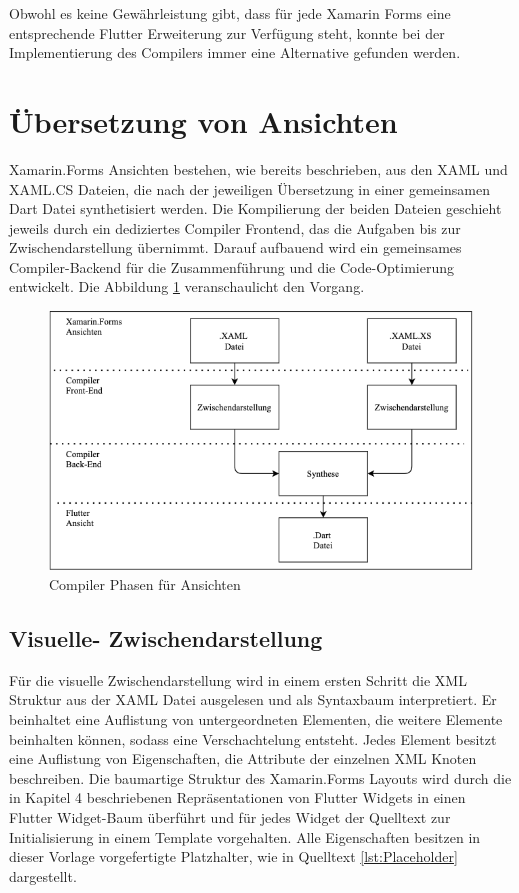 

 Obwohl es keine Gewährleistung gibt, dass für jede Xamarin Forms eine entsprechende Flutter 
Erweiterung zur Verfügung steht, konnte bei der Implementierung des Compilers immer eine  Alternative gefunden werden.


\section{Übersetzung von Ansichten}
Xamarin.Forms Ansichten bestehen, wie bereits beschrieben,  aus den XAML und XAML.CS Dateien, die nach der jeweiligen Übersetzung  in einer gemeinsamen Dart Datei synthetisiert werden.  
Die Kompilierung der beiden Dateien geschieht jeweils durch ein dediziertes Compiler Frontend, das die Aufgaben bis zur Zwischendarstellung übernimmt.  Darauf aufbauend wird ein gemeinsames Compiler-Backend für die Zusammenführung und die Code-Optimierung entwickelt.  Die Abbildung  \ref{fig:ViewCompilerPhases} veranschaulicht den Vorgang. 

\begin{figure}[!ht]
 \includegraphics[width=\textwidth,keepaspectratio]{Images/Implementation/ViewCompiler.png}
 \caption{Compiler Phasen für Ansichten}
 \label{fig:ViewCompilerPhases}
\end{figure}

\subsection{Visuelle- Zwischendarstellung}

Für die visuelle Zwischendarstellung wird in einem ersten Schritt die XML Struktur
aus der XAML Datei ausgelesen und als Syntaxbaum interpretiert.  Er beinhaltet eine Auflistung von untergeordneten Elementen,  die weitere Elemente beinhalten können,  sodass eine Verschachtelung  entsteht.  Jedes Element besitzt eine Auflistung von Eigenschaften, die Attribute der einzelnen XML Knoten beschreiben.  Die baumartige Struktur des Xamarin.Forms Layouts wird durch die in Kapitel 4 beschriebenen Repräsentationen von Flutter Widgets in einen Flutter Widget-Baum überführt und für jedes Widget der Quelltext zur Initialisierung in einem Template vorgehalten.  Alle Eigenschaften besitzen in dieser Vorlage vorgefertigte Platzhalter, wie in Quelltext \ref{lst:Placeholder} dargestellt.


